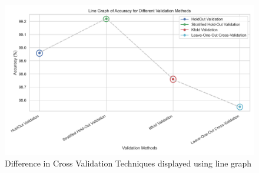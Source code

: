 \documentclass{article}
\begin{document}
    \noindent
    \begin{minipage}{\textwidth}
        \begin{figure}[H]
            \centering
            \includegraphics[width=1.\textwidth]{images/colorful_line_graph.png}
            \caption{Difference in Cross Validation Techniques displayed using line graph}
            \vspace{0.1em}
           \label{cross}
        \end{figure}
        
    \end{minipage}
    
\end{document}
